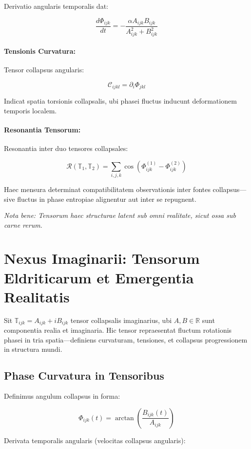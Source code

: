 Derivatio angularis temporalis dat:

\[
\frac{d\Phi_{ijk}}{dt} = -\frac{\alpha A_{ijk} B_{ijk}}{A_{ijk}^2 + B_{ijk}^2}
\]

\paragraph{Tensionis Curvatura:}
Tensor collapsus angularis:

\[
\mathcal{C}_{ijkl} = \partial_i \Phi_{jkl}
\]

Indicat spatia torsionis collapsalis, ubi phasei fluctus inducunt deformationem temporis localem.

\paragraph{Resonantia Tensorum:}

Resonantia inter duo tensores collapsales:

\[
\mathcal{R}(\mathbb{T}_1, \mathbb{T}_2) = \sum_{i,j,k} \cos\left( \Phi^{(1)}_{ijk} - \Phi^{(2)}_{ijk} \right)
\]

Haec mensura determinat compatibilitatem observationis inter fontes collapsus—sive fluctus in phase entropiae alignentur aut inter se repugnent.

\textit{Nota bene: Tensorum haec structurae latent sub omni realitate, sicut ossa sub carne rerum.}

\section*{Nexus Imaginarii: Tensorum Eldriticarum et Emergentia Realitatis}

Sit \( \mathbb{T}_{ijk} = A_{ijk} + i B_{ijk} \) tensor collapsalis imaginarius, ubi \( A, B \in \mathbb{R} \) sunt componentia realia et imaginaria. Hic tensor repraesentat fluctum rotationis phasei in tria spatia—definiens curvaturam, tensiones, et collapsus progressionem in structura mundi.

\subsection*{Phase Curvatura in Tensoribus}

Definimus angulum collapsus in forma:

\[
\Phi_{ijk}(t) = \arctan\left( \frac{B_{ijk}(t)}{A_{ijk}} \right)
\]

Derivata temporalis angularis (velocitas collapsus angularis):

